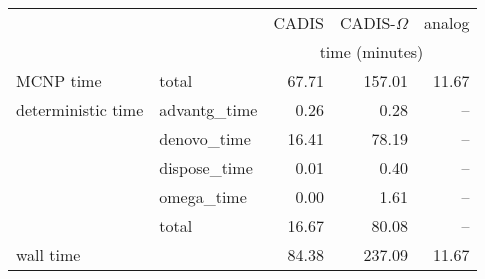 \begin{tabular}{llrrr}
\toprule
          &             &          CADIS & CADIS-$\Omega$ &         analog \\
        &              & \multicolumn{3}{c}{time (minutes)} \\
\midrule
MCNP time & total &          67.71 &         157.01 &          11.67 \\
deterministic time & advantg\_time &           0.26 &           0.28 &            -- \\
          & denovo\_time &          16.41 &          78.19 &            -- \\
          & dispose\_time &           0.01 &           0.40 &            -- \\
          & omega\_time &           0.00 &           1.61 &            -- \\
          & total &          16.67 &          80.08 &            -- \\
wall time &              &          84.38 &         237.09 &          11.67 \\
\bottomrule
\end{tabular}
